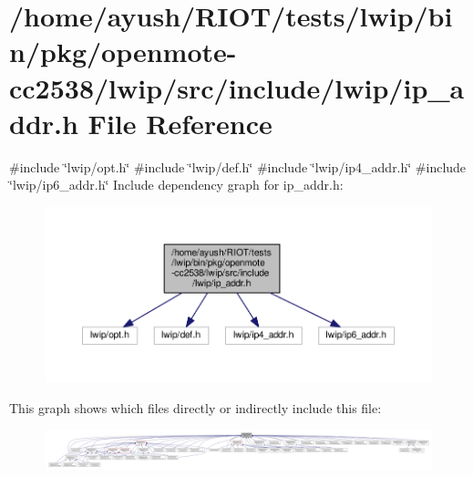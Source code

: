 \hypertarget{openmote-cc2538_2lwip_2src_2include_2lwip_2ip__addr_8h}{}\section{/home/ayush/\+R\+I\+O\+T/tests/lwip/bin/pkg/openmote-\/cc2538/lwip/src/include/lwip/ip\+\_\+addr.h File Reference}
\label{openmote-cc2538_2lwip_2src_2include_2lwip_2ip__addr_8h}
{\ttfamily \#include \char`\"{}lwip/opt.\+h\char`\"{}}\newline
{\ttfamily \#include \char`\"{}lwip/def.\+h\char`\"{}}\newline
{\ttfamily \#include \char`\"{}lwip/ip4\+\_\+addr.\+h\char`\"{}}\newline
{\ttfamily \#include \char`\"{}lwip/ip6\+\_\+addr.\+h\char`\"{}}\newline
Include dependency graph for ip\+\_\+addr.\+h\+:
\nopagebreak
\begin{figure}[H]
\begin{center}
\leavevmode
\includegraphics[width=350pt]{openmote-cc2538_2lwip_2src_2include_2lwip_2ip__addr_8h__incl}
\end{center}
\end{figure}
This graph shows which files directly or indirectly include this file\+:
\nopagebreak
\begin{figure}[H]
\begin{center}
\leavevmode
\includegraphics[width=350pt]{openmote-cc2538_2lwip_2src_2include_2lwip_2ip__addr_8h__dep__incl}
\end{center}
\end{figure}
